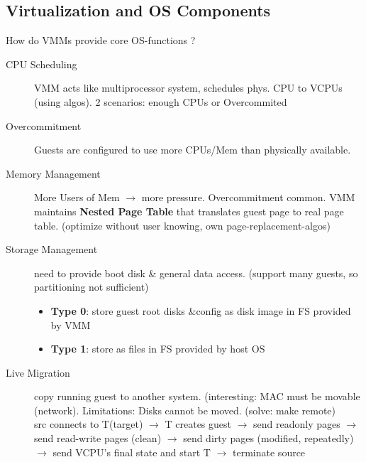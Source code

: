 \subsection*{Virtualization and OS Components}
How do VMMs provide core OS-functions ?
\begin{description}
    \item[CPU Scheduling]VMM acts like multiprocessor system, schedules phys. CPU to VCPUs (using algos). 2 scenarios: enough CPUs or Overcommited %
    \item[Overcommitment]Guests are configured to use more CPUs/Mem than physically available.
    \item[Memory Management] More Users of Mem $\rightarrow$ more pressure. Overcommitment common. VMM maintains \textbf{Nested Page Table} that translates guest page to real page table. (optimize without user knowing, own page-replacement-algos)
    \item[Storage Management] need to provide boot disk \& general data access. (support many guests, so partitioning not sufficient)
        \begin{itemize}[label={}, labelsep=0pt]
            \item \textbf{Type 0}: store guest root disks \&config as disk image in FS provided by VMM
            \item \textbf{Type 1}: store as files in FS provided by host OS %
        \end{itemize}
    \item[Live Migration]copy running guest to another system. (interesting: MAC must be movable (network). Limitations: Disks cannot be moved. (solve: make remote) \\
    src connects to T(target) $\rightarrow$ T creates guest $\rightarrow$ send readonly pages $\rightarrow$ send read-write pages (clean) $\rightarrow$ send dirty pages (modified, repeatedly) $\rightarrow$ send VCPU's final state and start T $\rightarrow$ terminate source
\end{description}

